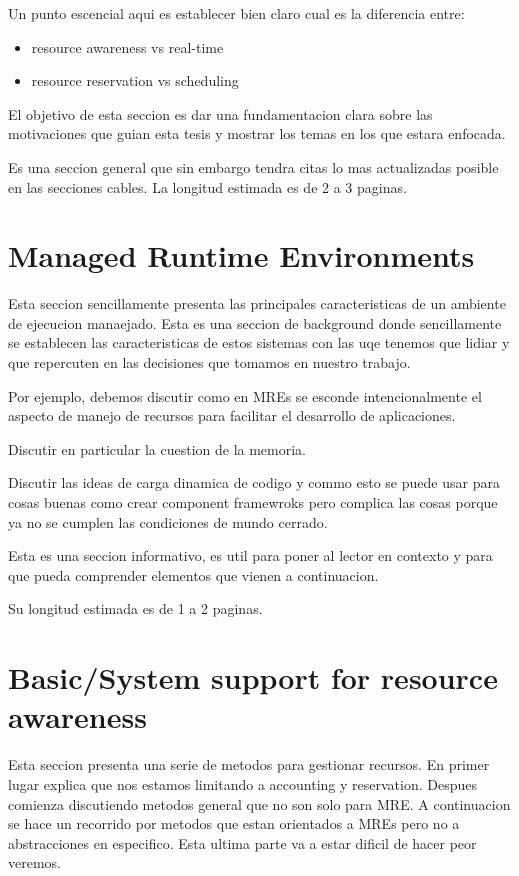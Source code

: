 Un punto escencial aqui es establecer bien claro cual es la diferencia entre:
\begin{itemize}
\item resource awareness vs real-time
\item resource reservation vs scheduling
\end{itemize}

El objetivo de esta seccion es dar una fundamentacion clara sobre las motivaciones que guian esta tesis y mostrar los temas en los que estara enfocada.

Es una seccion general que sin embargo tendra citas lo mas actualizadas posible en las secciones cables. La longitud estimada es de 2 a 3 paginas.

\section{Managed Runtime Environments}

Esta seccion sencillamente presenta las principales caracteristicas de un ambiente de ejecucion manaejado.
Esta es una seccion de background donde sencillamente se establecen las caracteristicas de estos sistemas con las uqe tenemos que lidiar y que repercuten en las decisiones que tomamos en nuestro trabajo.

Por ejemplo, debemos discutir como en MREs se esconde intencionalmente el aspecto de manejo de recursos para facilitar el desarrollo de aplicaciones.

Discutir en particular la cuestion de la memoria.

Discutir las ideas de carga dinamica de codigo y commo esto se puede usar para cosas buenas como crear component framewroks pero complica las cosas porque ya no se cumplen las condiciones de mundo cerrado.

Esta es una seccion informativo, es util para poner al lector en contexto y para que pueda comprender elementos que vienen a continuacion.

Su longitud estimada es de 1 a 2 paginas.

\section{Basic/System support for resource awareness}

Esta seccion presenta una serie de metodos para gestionar recursos. En primer lugar explica que nos estamos limitando a accounting y reservation. Despues comienza discutiendo metodos general que no son solo para MRE. A continuacion se hace un recorrido por metodos que estan orientados a MREs pero no a abstracciones en especifico. Esta ultima parte va a estar dificil de hacer peor veremos. 


